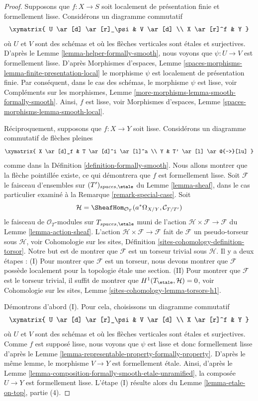 \begin{proof}
Supposons que $f : X \to S$ soit localement de présentation finie et formellement lisse.
Considérons un diagramme commutatif
$$
\xymatrix{
U \ar[d] \ar[r]_\psi & V \ar[d] \\
X \ar[r]^f & Y
}
$$
où $U$ et $V$ sont des schémas et où les flèches verticales sont étales et
surjectives. D'après le
Lemme \ref{lemma-helper-formally-smooth},
nous voyons que $\psi : U \to V$ est formellement lisse. D'après
Morphismes d'espaces, Lemme
\ref{spaces-morphisms-lemma-finite-presentation-local}
le morphisme $\psi$ est localement de présentation finie.
Par conséquent, dans le cas des schémas, le morphisme
$\psi$ est lisse, voir
Compléments sur les morphismes, Lemme \ref{more-morphisms-lemma-smooth-formally-smooth}.
Ainsi, $f$ est lisse, voir
Morphismes d'espaces, Lemme
\ref{spaces-morphisms-lemma-smooth-local}.

\medskip\noindent
Réciproquement, supposons que $f : X \to Y$ soit lisse.
Considérons un diagramme commutatif de flèches pleines
$$
\xymatrix{
X \ar[d]_f & T \ar[d]^i \ar[l]^a \\
Y & T' \ar[l] \ar@{-->}[lu]
}
$$
comme dans la Définition \ref{definition-formally-smooth}. Nous allons montrer que la
flèche pointillée existe, ce qui démontrera que $f$ est formellement lisse.
Soit $\mathcal{F}$ le faisceau d'ensembles sur $(T')_{spaces, \etale}$ du
Lemme \ref{lemma-sheaf}, dans le cas particulier examiné à la
Remarque \ref{remark-special-case}. Soit
$$
\mathcal{H} =
\SheafHom_{\mathcal{O}_T}(a^*\Omega_{X/Y}, \mathcal{C}_{T/T'})
$$
le faisceau de $\mathcal{O}_T$-modules sur $T_{spaces, \etale}$
muni de l'action $\mathcal{H} \times \mathcal{F} \to \mathcal{F}$
du Lemme \ref{lemma-action-sheaf}.
L'action $\mathcal{H} \times \mathcal{F} \to \mathcal{F}$
fait de $\mathcal{F}$ un pseudo-torseur sous $\mathcal{H}$, voir
Cohomologie sur les sites, Définition \ref{sites-cohomology-definition-torsor}.
Notre but est de montrer que $\mathcal{F}$ est un torseur trivial sous $\mathcal{H}$.
Il y a deux étapes : (I) Pour montrer que $\mathcal{F}$ est un torseur,
nous devons montrer que $\mathcal{F}$ possède localement pour la topologie étale
une section. (II) Pour montrer que $\mathcal{F}$ est le torseur trivial,
il suffit de montrer que $H^1(T_\etale, \mathcal{H}) = 0$, voir
Cohomologie sur les sites, Lemme \ref{sites-cohomology-lemma-torsors-h1}.

\medskip\noindent
Démontrons d'abord (I). Pour cela, choisissons un diagramme commutatif
$$
\xymatrix{
U \ar[d] \ar[r]_\psi & V \ar[d] \\
X \ar[r]^f & Y
}
$$
où $U$ et $V$ sont des schémas et où les flèches verticales sont étales et
surjectives. Comme $f$ est supposé lisse, nous voyons que $\psi$ est lisse et
donc formellement lisse d'après le
Lemme \ref{lemma-representable-property-formally-property}.
D'après le même lemme, le morphisme $V \to Y$ est formellement étale. Ainsi, d'après le
Lemme \ref{lemma-composition-formally-smooth-etale-unramified},
la composée $U \to Y$ est formellement lisse. L'étape (I) résulte alors du
Lemme \ref{lemma-etale-on-top}, partie (4).


\end{proof}
